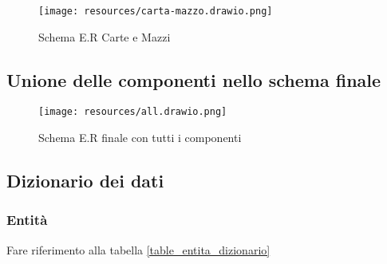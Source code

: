 \documentclass{article}
\begin{document}
\begin{figure}
    \centering
    \texttt{[image: resources/carta-mazzo.drawio.png]}
    \caption{Schema E.R Carte e Mazzi}
\end{figure}

\subsection{Unione delle componenti nello schema finale}

\begin{figure}
    \centering
    \texttt{[image: resources/all.drawio.png]}
    \caption{Schema E.R finale con tutti i componenti}
\end{figure}

\subsection{Dizionario dei dati}

\subsubsection{Entità}
Fare riferimento alla tabella \ref{table_entita_dizionario}
\end{document}
